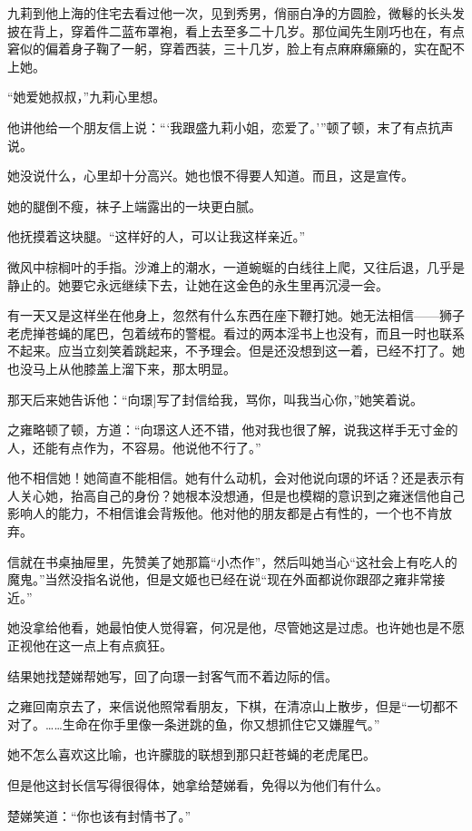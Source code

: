 \par 九莉到他上海的住宅去看过他一次，见到秀男，俏丽白净的方圆脸，微鬈的长头发披在背上，穿着件二蓝布罩袍，看上去至多二十几岁。那位闻先生刚巧也在，有点窘似的偏着身子鞠了一躬，穿着西装，三十几岁，脸上有点麻麻癞癞的，实在配不上她。
\par “她爱她叔叔，”九莉心里想。
\par 他讲他给一个朋友信上说：“‘我跟盛九莉小姐，恋爱了。'”顿了顿，末了有点抗声说。
\par 她没说什么，心里却十分高兴。她也恨不得要人知道。而且，这是宣传。
\par 她的腿倒不瘦，袜子上端露出的一块更白腻。
\par 他抚摸着这块腿。“这样好的人，可以让我这样亲近。”
\par 微风中棕榈叶的手指。沙滩上的潮水，一道蜿蜒的白线往上爬，又往后退，几乎是静止的。她要它永远继续下去，让她在这金色的永生里再沉浸一会。
\par 有一天又是这样坐在他身上，忽然有什么东西在座下鞭打她。她无法相信——狮子老虎掸苍蝇的尾巴，包着绒布的警棍。看过的两本淫书上也没有，而且一时也联系不起来。应当立刻笑着跳起来，不予理会。但是还没想到这一着，已经不打了。她也没马上从他膝盖上溜下来，那太明显。
\par 那天后来她告诉他：“向璟]写了封信给我，骂你，叫我当心你，”她笑着说。
\par 之雍略顿了顿，方道：“向璟这人还不错，他对我也很了解，说我这样手无寸金的人，还能有点作为，不容易。他说他不行了。”
\par 他不相信她！她简直不能相信。她有什么动机，会对他说向璟的坏话？还是表示有人关心她，抬高自己的身份？她根本没想通，但是也模糊的意识到之雍迷信他自己影响人的能力，不相信谁会背叛他。他对他的朋友都是占有性的，一个也不肯放弃。
\par 信就在书桌抽屉里，先赞美了她那篇“小杰作”，然后叫她当心“这社会上有吃人的魔鬼。”当然没指名说他，但是文姬也已经在说“现在外面都说你跟邵之雍非常接近。”
\par 她没拿给他看，她最怕使人觉得窘，何况是他，尽管她这是过虑。也许她也是不愿正视他在这一点上有点疯狂。
\par 结果她找楚娣帮她写，回了向璟一封客气而不着边际的信。
\par 之雍回南京去了，来信说他照常看朋友，下棋，在清凉山上散步，但是“一切都不对了。……生命在你手里像一条迸跳的鱼，你又想抓住它又嫌腥气。”
\par 她不怎么喜欢这比喻，也许朦胧的联想到那只赶苍蝇的老虎尾巴。
\par 但是他这封长信写得很得体，她拿给楚娣看，免得以为他们有什么。
\par 楚娣笑道：“你也该有封情书了。”
